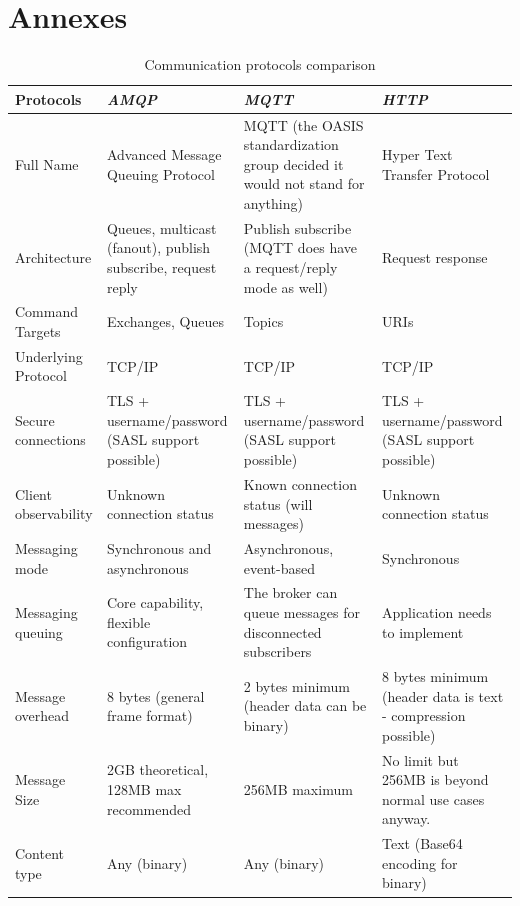 \section*{Annexes}
\newpage
\begin{table}[htbp]
    \onecolumn
    \centering
    \caption{Communication protocols comparison}
    \begin{center}
    \renewcommand{\arraystretch}{2}
    \begin{tabular}{|p{3cm}|p{4.5cm}|p{4.5cm}|p{4.5cm}|}
    \hline
    \textbf{{Protocols}}& \textbf{\textit{AMQP}}& \textbf{\textit{MQTT}}& \textbf{\textit{HTTP}} \\
    \hline
    Full Name & Advanced Message Queuing Protocol & MQTT (the OASIS standardization group decided it would not stand for anything) & Hyper Text Transfer Protocol\\
    \hline
    Architecture & Queues, multicast (fanout), publish subscribe, request reply & Publish subscribe (MQTT does have a request/reply mode as well) & Request response\\
    \hline
    Command Targets & Exchanges, Queues & Topics & URIs\\
    \hline
    Underlying Protocol & TCP/IP & TCP/IP & TCP/IP\\
    \hline
    Secure connections & TLS + username/password (SASL support possible) & TLS + username/password (SASL support possible) & TLS + username/password (SASL support possible)\\
    \hline
    Client observability & Unknown connection status & Known connection status (will messages) & Unknown connection status\\
    \hline
    Messaging mode & Synchronous and asynchronous & Asynchronous, event-based & Synchronous\\
    \hline
    Messaging queuing & Core capability, flexible configuration & The broker can queue messages for disconnected subscribers & Application needs to implement\\
    \hline
    Message overhead & 8 bytes (general frame format) & 2 bytes minimum (header data can be binary) & 8 bytes minimum (header data is text - compression possible)\\
    \hline
    Message Size & 2GB theoretical, 128MB max recommended & 256MB maximum & No limit but 256MB is beyond normal use cases anyway.\\
    \hline
    Content type & Any (binary) & Any (binary) & Text (Base64 encoding for binary)\\

\end{tabular}
\end{center}
\end{table}
